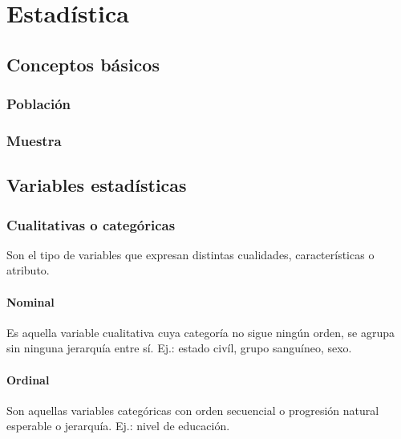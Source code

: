 \documentclass{report}
\title{}
\date{}
\author{}
\begin{document}
  \maketitle
  \setcounter{tocdepth}{5}
  \tableofcontents
  \newpage

  \chapter*{Estadística}

    \section*{Conceptos básicos}

      \subsection*{Población}

      \subsection*{Muestra}

    \section*{Variables estadísticas}

      \subsection*{Cualitativas o categóricas}
        Son el tipo de variables que expresan distintas cualidades, características 
        o atributo.

        \subsubsection*{Nominal}
          Es aquella variable cualitativa cuya categoría no sigue ningún orden, 
          se agrupa sin ninguna jerarquía entre sí. Ej.: estado civíl, grupo 
          sanguíneo, sexo.
        \subsubsection*{Ordinal} 
          Son aquellas variables categóricas con orden secuencial o progresión 
          natural esperable o jerarquía. Ej.: nivel de educación.
\end{document}
